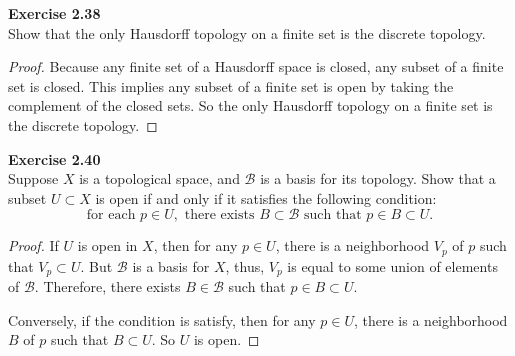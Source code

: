 \documentclass[12pt, a4paper]{article}
\theoremstyle{plain}
\newcommand{\B}{\mathscr{B}}
\newenvironment{exercise}[2][Exercise]
    { \begin{mdframed}[backgroundcolor=gray!20] \textbf{#1 #2} \\}
    {  \end{mdframed}}
\begin{document}
\begin{exercise}{2.38}
Show that the only Hausdorff topology on a finite set is the discrete topology.
\end{exercise}
	\begin{proof}
	Because any finite set of a Hausdorff space is closed, any subset of a finite set is closed. This implies any subset of a finite set is open by taking the complement of the closed sets. So the only Hausdorff topology on a finite set is the discrete topology.
	\end{proof}
	
\pagebreak

\begin{exercise}{2.40}
Suppose $X$ is a topological space, and $\B$ is a basis for its topology. Show that a subset $U\subset X$ is open if and only if it satisfies the following condition:
\[
\text{for each } p\in U, \text{ there exists } B\subset\B \text{ such that }p\in B\subset U.
\]
\end{exercise}
	\begin{proof}
	If $U$ is open in $X$, then for any $p\in U$, there is a neighborhood $V_p$ of $p$ such that $V_p\subset U$. But $\B$ is a basis for $X$, thus, $V_p$ is equal to some union of elements of $\B$. Therefore, there exists $B\in\B$ such that $p\in B\subset U$.
	
	Conversely, if the condition is satisfy, then for any $p\in U$, there is a neighborhood $B$ of $p$ such that $B\subset U$. So $U$ is open.
	\end{proof}
	
\end{document}
